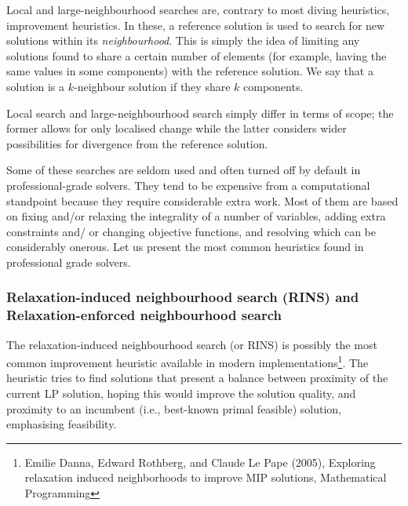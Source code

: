 Local and large-neighbourhood searches are, contrary to most diving heuristics, improvement heuristics. In these, a reference solution is used to search for new solutions within its \emph{neighbourhood}. This is simply the idea of limiting any solutions found to share a certain number of elements (for example, having the same values in some components) with the reference solution. We say that a solution is a $k$-neighbour solution if they share $k$ components.

Local search and large-neighbourhood search simply differ in terms of scope; the former allows for only localised change while the latter considers wider possibilities for divergence from the reference solution.

Some of these searches are seldom used and often turned off by default in professional-grade solvers. They tend to be expensive from a computational standpoint because they require considerable extra work. Most of them are based on fixing and/or relaxing the integrality of a number of variables, adding extra constraints and/ or changing objective functions, and resolving which can be considerably onerous. Let us present the most common heuristics found in professional grade solvers. 


\subsubsection{Relaxation-induced neighbourhood search (RINS) and Relaxation-enforced neighbourhood search}

The relaxation-induced neighbourhood search (or RINS) is possibly the most common improvement heuristic available in modern implementations\footnote{Emilie Danna, Edward Rothberg, and Claude Le Pape (2005), Exploring relaxation induced neighborhoods to improve MIP solutions, Mathematical Programming}. The heuristic tries to find solutions that present a balance between proximity of the current LP solution, hoping this would improve the solution quality, and proximity to an incumbent (i.e., best-known primal feasible) solution, emphasising feasibility.

